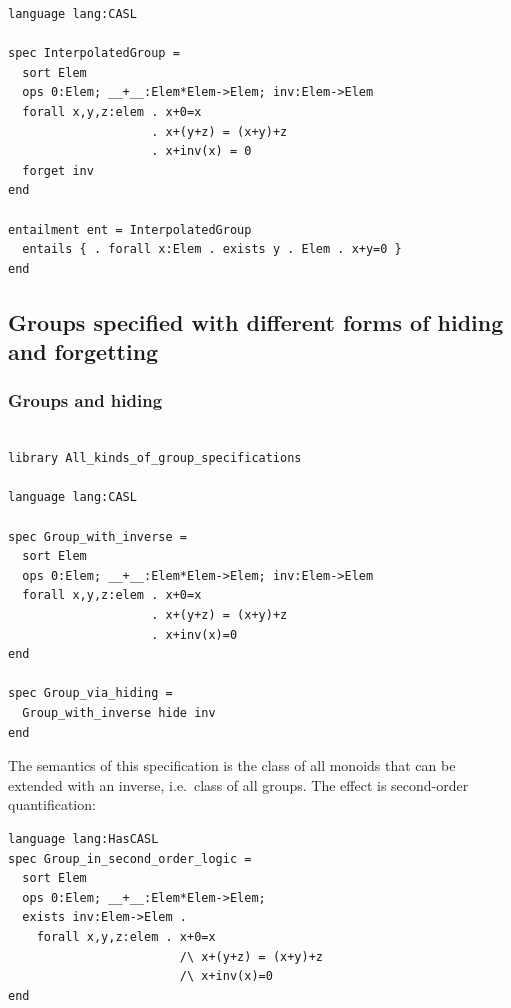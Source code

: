\documentclass[10pt,fleqn,final]{scrreprt}
\newcommand{\ssclause}[1]{\subsection{#1}}
\newcommand{\sssclause}[1]{\subsubsection{#1}}
\begin{document}
\begin{lstlisting}[basicstyle=\ttfamily,language=dolText,morekeywords={props,ObjectProperty,Class,DisjointUnionOf,SubClassOf,Characteristics,Transitive,Asymmetric,SubPropertyOf,DisjointClasses,EquivalentTo,inverse,only,forall,iff,if,or,exists,sort,ops,forget,entails,entailment,spec},escapechar=@,mathescape]
language lang:CASL

spec InterpolatedGroup =
  sort Elem
  ops 0:Elem; __+__:Elem*Elem->Elem; inv:Elem->Elem
  forall x,y,z:elem . x+0=x
                    . x+(y+z) = (x+y)+z
                    . x+inv(x) = 0
  forget inv
end

entailment ent = InterpolatedGroup 
  entails { . forall x:Elem . exists y . Elem . x+y=0 }
end
\end{lstlisting}

\ssclause{Groups specified with different forms of hiding and forgetting}

\sssclause{Groups and hiding}
\begin{lstlisting}[basicstyle=\ttfamily,language=dolText,morekeywords={props,ObjectProperty,Class,DisjointUnionOf,SubClassOf,Characteristics,Transitive,Asymmetric,SubPropertyOf,DisjointClasses,EquivalentTo,inverse,only,forall,iff,if,or,exists,sort,ops,spec},escapechar=@,mathescape]
%prefix( lang: <http://purl.net/DOL/languages/> )%

library All_kinds_of_group_specifications

language lang:CASL

spec Group_with_inverse =
  sort Elem
  ops 0:Elem; __+__:Elem*Elem->Elem; inv:Elem->Elem
  forall x,y,z:elem . x+0=x
                    . x+(y+z) = (x+y)+z
                    . x+inv(x)=0
end

spec Group_via_hiding =
  Group_with_inverse hide inv
end
\end{lstlisting}

The semantics of this specification is the class of all monoids that
can be extended with an inverse, i.e.\ class of all groups. The effect
is second-order quantification:

\begin{lstlisting}[basicstyle=\ttfamily,language=dolText,morekeywords={props,ObjectProperty,Class,DisjointUnionOf,SubClassOf,Characteristics,Transitive,Asymmetric,SubPropertyOf,DisjointClasses,EquivalentTo,inverse,only,forall,iff,if,or,exists,sort,ops,spec},escapechar=@,mathescape]
language lang:HasCASL
spec Group_in_second_order_logic =
  sort Elem
  ops 0:Elem; __+__:Elem*Elem->Elem; 
  exists inv:Elem->Elem .
    forall x,y,z:elem . x+0=x
                        /\ x+(y+z) = (x+y)+z
                        /\ x+inv(x)=0
end
\end{lstlisting}
\end{document}
